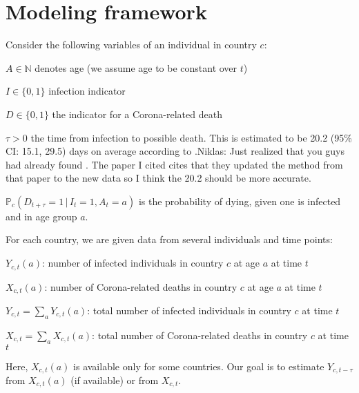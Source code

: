 \documentclass[a4paper]{article}
\newcommand\N{\mathbb{N}}
\renewcommand\P{\mathbb{P}}
\newcommand{\given}{\, \vert \,}
\newcommand\Niklas[1]{{\color{Fuchsia}Niklas: #1}}
\begin{document}
\section{Modeling framework} \label{sec:model}
Consider the following variables of an individual in country $c$: 
\begin{compactitem}
\item $A \in \N$ denotes age (we assume age to be constant over $t$)
\item $I \in \{0,1\}$ infection indicator
\item $D \in \{0,1\}$ the indicator for a Corona-related death 
\item $\tau > 0$ the time from infection to possible death. This is
  estimated to be 20.2 (95\% CI: 15.1, 29.5) days on average according
  to \citet{jung2020real}.\Niklas{Just realized that you guys had
    already found \cite{linton2020epidemiological}. The paper I cited
    cites that they updated the method from that paper to the new data
  so I think the 20.2 should be more accurate.}
\item $\P_c(D_{t+\tau} = 1 \given I_t = 1, A_t = a)$ is the probability of dying, given one is infected and in age group $a$.
\end{compactitem}
For each country, we are given data from several individuals and time points:
\begin{compactitem}
\item $Y_{c,t}(a)$: number of infected individuals in country $c$ at age $a$ at time $t$
\item $X_{c,t}(a)$: number of Corona-related deaths in country $c$ at age $a$ at time $t$
\item $Y_{c,t} = \sum_a Y_{c,t}(a)$: total number of infected individuals in country $c$ at time $t$
\item $X_{c,t} = \sum_a X_{c,t}(a)$: total number of Corona-related deaths in country $c$ at time $t$
\end{compactitem}
%
Here, $X_{c,t}(a)$ is available only for some countries.
Our goal is to estimate $Y_{c,t-\tau}$ from $X_{c,t}(a)$ (if available) or from $X_{c,t}$. 
\end{document}
